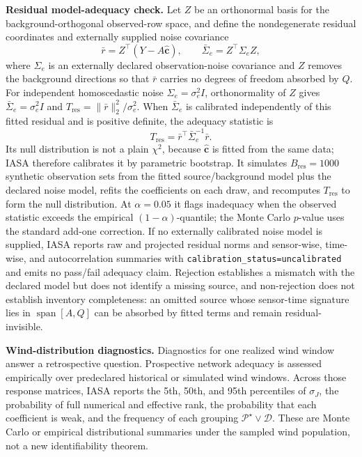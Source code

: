 \noindent\textbf{Residual model-adequacy check.}
Let \(Z\) be an orthonormal basis for the background-orthogonal observed-row
space, and define the nondegenerate residual coordinates and externally supplied
noise covariance
\begin{equation}
\bar r=Z^\top(Y-A\widehat{\mathbf c}),
\qquad
\bar\Sigma_e=Z^\top\Sigma_e Z,
\label{eq:adequacy_coordinates}
\end{equation}
where \(\Sigma_e\) is an externally declared observation-noise covariance and
\(Z\) removes the background directions so that \(\bar r\) carries no degrees of
freedom absorbed by \(Q\).  For independent homoscedastic noise
\(\Sigma_e=\sigma_e^2 I\), orthonormality of \(Z\) gives
\(\bar\Sigma_e=\sigma_e^2 I\) and \(T_{\mathrm{res}}=\|\bar r\|_2^2/\sigma_e^2\).
When \(\bar\Sigma_e\) is calibrated independently of this fitted residual and is
positive definite, the adequacy statistic is
\begin{equation}
T_{\mathrm{res}}=\bar r^\top\bar\Sigma_e^{-1}\bar r.
\label{eq:residual_adequacy_statistic}
\end{equation}
Its null distribution is not a plain \(\chi^2\), because \(\widehat{\mathbf c}\)
is fitted from the same data; IASA therefore calibrates it by parametric
bootstrap.  It simulates \(B_{\mathrm{res}}=1000\) synthetic observation sets from
the fitted source/background model plus the declared noise model, refits the
coefficients on each draw, and recomputes \(T_{\mathrm{res}}\) to form the null
distribution.  At \(\alpha=0.05\) it flags inadequacy when the observed statistic
exceeds the empirical \((1-\alpha)\)-quantile; the Monte Carlo \(p\)-value uses
the standard add-one correction.  If no externally calibrated noise model is
supplied, IASA reports raw and projected residual norms and sensor-wise,
time-wise, and autocorrelation summaries with
\texttt{calibration\_status=uncalibrated} and emits no pass/fail adequacy claim.
Rejection establishes a mismatch with the declared model but does not identify a
missing source, and non-rejection does not establish inventory completeness: an
omitted source whose sensor-time signature lies in
\(\operatorname{span}[A,Q]\) can be absorbed by fitted terms
and remain residual-invisible.

\noindent\textbf{Wind-distribution diagnostics.}
Diagnostics for one realized wind window answer a retrospective question.
Prospective network adequacy is assessed empirically over predeclared historical
or simulated wind windows.  Across those response matrices, IASA reports the
5th, 50th, and 95th percentiles of \(\sigma_J\), the probability of full
numerical and effective rank, the probability that each coefficient is weak,
and the frequency of each grouping
\(\mathcal P^\star\vee\mathcal D\).  These are Monte Carlo or empirical
distributional summaries under the sampled wind population, not a new
identifiability theorem.

